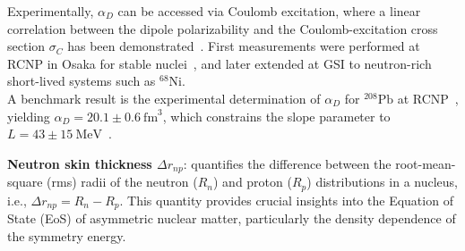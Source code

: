 Experimentally, $\alpha_D$ can be accessed via Coulomb excitation, where a linear correlation between the dipole polarizability and the Coulomb-excitation cross section $\sigma_C$ has been demonstrated~\cite{horvat2021evolution}. First measurements were performed at RCNP in Osaka for stable nuclei~\cite{fearick2023electric}, and later extended at GSI to neutron-rich short-lived systems such as $^{68}\mathrm{Ni}$.\\
A benchmark result is the experimental determination of $\alpha_D$ for $^{208}\mathrm{Pb}$ at RCNP~\cite{tamii2011complete}, yielding $\alpha_D = 20.1 \pm 0.6~\mathrm{fm}^3$, which constrains the slope parameter to $L = 43 \pm 15~\mathrm{MeV}$~\cite{roca2013electric}.

\quad \textbf{Neutron skin thickness $\Delta r_{np}$}: quantifies the difference between the root-mean-square (rms) radii of the neutron ($R_n$) and proton ($R_p$) distributions in a nucleus, i.e., $\Delta r_{np} = R_n - R_p$. This quantity provides crucial insights into the Equation of State (EoS) of asymmetric nuclear matter, particularly the density dependence of the symmetry energy.

